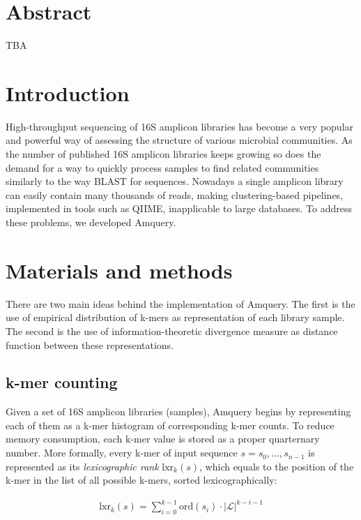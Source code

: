 \documentclass[10pt,letterpaper]{article}
\begin{document}
\section*{Abstract}
TBA

\linenumbers

\section*{Introduction}
High-throughput sequencing of 16S amplicon libraries has become a very popular and powerful way of assessing the structure of various microbial communities. As the number of published 16S amplicon libraries keeps growing so does the demand for a way to quickly process samples to find related communities similarly to the way BLAST for sequences. Nowadays a single amplicon library can easily contain many thousands of reads, making clustering-based pipelines, implemented in tools such as QIIME, inapplicable to large databases. To address these problems, we developed Amquery.


\section*{Materials and methods}
There are two main ideas behind the implementation of Amquery. The first is the use of empirical distribution of k-mers as representation of each library sample. The second is the use of information-theoretic divergence measure as distance function between these representations. 

\subsection*{k-mer counting}
Given a set of 16S amplicon libraries (samples), Amquery begins by representing each of them as a k-mer histogram of corresponding k-mer counts. To reduce memory consumption, each k-mer value is stored as a proper quarternary number.
More formally, every k-mer of input sequence $s = s_0,\dots,s_{n-1}$ is represented as its \textit{lexicographic rank} $\mathrm{lxr}_k(s)$, which equals to the position of the k-mer in the list of all possible k-mers, sorted lexicographically:

\begin{eqnarray}
\label{eq:schemeP}
    \mathrm{lxr}_k(s) = \sum_{i=0}^{k−1} \mathrm{ord}(s_i) \cdot |{\mathcal{L}}|^{k−i−1}
\end{eqnarray}
\end{document}
